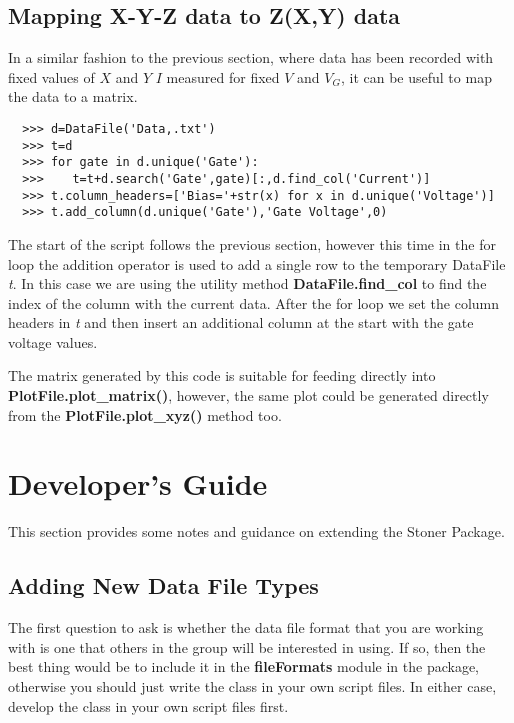 \documentclass[a4paper,11pt]{scrartcl}
\begin{document}
\subsection{Mapping X-Y-Z data to Z(X,Y) data}

In a similar fashion to the previous section, where data has been recorded with
fixed values of $X$ and $Y$ \eg $I$ measured for fixed $V$ and $V_G$, it can be
useful to map the data to a matrix.

\begin{verbatim}
  >>> d=DataFile('Data,.txt')
  >>> t=d
  >>> for gate in d.unique('Gate'):
  >>>    t=t+d.search('Gate',gate)[:,d.find_col('Current')]
  >>> t.column_headers=['Bias='+str(x) for x in d.unique('Voltage')]
  >>> t.add_column(d.unique('Gate'),'Gate Voltage',0)
\end{verbatim}

The start of the script follows the previous section, however this time in the
for loop the addition operator is used to add a single row to the temporary
DataFile \textit{t}. In this case we are using the utility method
\textbf{DataFile.find\_col} to find the index of the column with the current
data. After the for loop we set the column headers in \textit{t} and then insert
an additional column at the start with the gate voltage values.

The matrix generated by this code is suitable for feeding directly into \textbf{PlotFile.\linebreak plot\_matrix()}, however, the same plot could be generated directly from the \linebreak\textbf{PlotFile.plot\_xyz()} method too.

\section{Developer's Guide}

This section provides some notes and guidance on extending the Stoner Package.

\subsection{Adding New Data File Types}

The first question to ask is whether the data file format that you are working with is one that others in the group will be interested in using. If so, then the best thing would be to include it in the \textbf{fileFormats} module in the package, otherwise you should just write the class in your own script files. In either case, develop the class in your own script files first.
\end{document}
